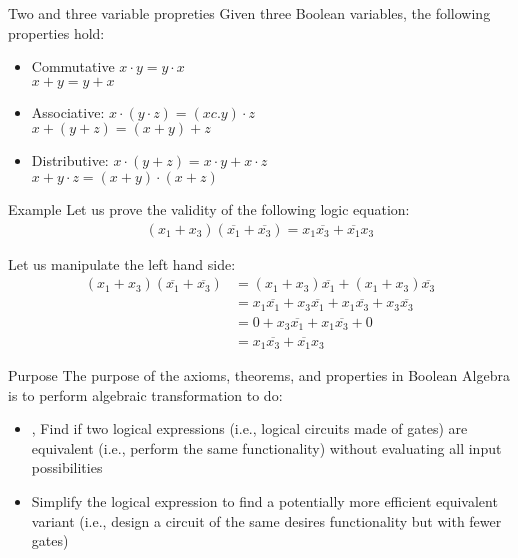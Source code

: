 \begin{parag}{Two and three variable propreties}
    Given three Boolean variables, the following properties hold:
    \begin{itemize}
        \item Commutative 
 $           x \cdot y = y \cdot x $\\
$            x + y = y + x$

    \item Associative: 
$        x \cdot (y \cdot z ) = (x c. y )  \cdot z $\\
 $       x + ( y + z) = ( x + y) + z$
    
\item Distributive: 
   $ x \cdot (y + z) = x \cdot y + x \cdot z $\\
$    x + y \cdot z = (x + y) \cdot (x + z)$

    \end{itemize}
  
\end{parag}
\begin{parag}{Example}
    Let us prove the validity of the following logic equation:
    \begin{align*}
        (x_1 + x_3) ( \overline{x_1} + \overline{x_3}) = x_1 \overline{x_3} + \overline{x_1}x_3
    \end{align*}

    Let us manipulate the left hand side:
    \begin{align*}
        (x_1 + x_3)( \overline{x_1} + \overline{x_3}) &= (x_1 + x_3) \overline{x_1} + (x_1 + x_3) \overline{x_3}\\
    &= x_1 \overline{x_1} + x_3 \overline{x_1} + x_1 \overline{x_3} + x_3 \overline{x_3} \\
    &= 0 + x_3 \overline{x_1} + x_1 \overline{x_3} + 0 \\
    &= x_1 \overline{x_3} + \overline{x_1}x_3
    \end{align*}
\end{parag}
\begin{parag}{Purpose}
    The purpose of the axioms, theorems, and properties in Boolean Algebra is to perform algebraic transformation to do:
    \begin{itemize}
        \item {}, Find if two logical expressions (i.e., logical circuits made of gates) are equivalent (i.e., perform the same functionality) without evaluating all input possibilities
        \item {} Simplify the logical expression to find a potentially more efficient equivalent variant (i.e., design a circuit of the same desires functionality but with fewer gates)
    \end{itemize}
\end{parag}

